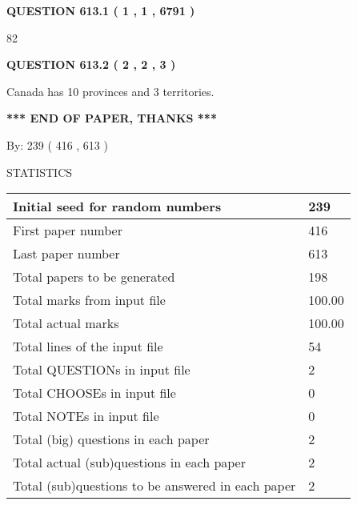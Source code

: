 \documentclass[12pt]{article}
\begin{document}
   
  
\vspace{0.2in}
  
{\textbf{\Large{QUESTION
613.1 
 ( 1 , 1 , 6791 )
}}}
  
  
 
 
\noindent{}

82
 
 
  
\vspace{0.2in}
  
{\textbf{\Large{QUESTION
613.2 
 ( 2 , 2 , 3 )
}}}
  
  
 
 
\noindent{}
 
 
Canada has 10  provinces and 3 territories.
 
 
 
 
   
   
 \vspace{0.2in}
 
   
   
   
   
\vspace{1.0in} 
{\textbf{\large{ *** END OF PAPER, THANKS *** }}} 
   
   
\hspace{1.0in} By: 
 239 ( 416 ,  613 )
   
   
   
\vspace{0.2in}
\vspace{0.2in}
   
   
 \newpage
\setcounter{page}{1} 
   
   
 {\LARGE{STATISTICS}}
   
\vspace{0.2in}
   
 \begin{tabular}{|l|l|}
 \hline
 Initial seed for random numbers & 239  \\
\hline
 First paper number & 416  \\
\hline
 Last  paper number & 613  \\
\hline
 Total papers to be generated & 198  \\
\hline
Total marks from input file & 100.00 \\
\hline
Total actual marks & 100.00 \\
\hline
 Total lines of the input file & 54  \\
 \hline
 Total QUESTIONs in input file & 2  \\
\hline
 Total CHOOSEs in input file & 0  \\
\hline
 Total NOTEs in input file & 0  \\
\hline
 Total (big) questions in each paper & 2  \\
\hline
 Total actual (sub)questions in each paper & 2  \\
\hline
 Total (sub)questions to be answered in each paper & 2  \\
\hline
 \end{tabular}
   
\end{document}

